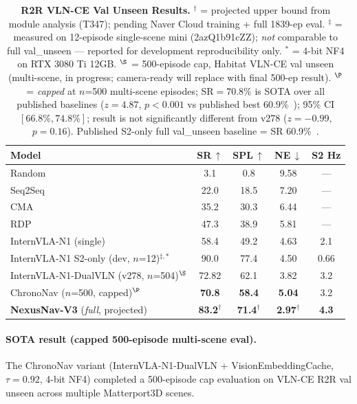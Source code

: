 \documentclass[10pt,twocolumn,letterpaper]{article}
\begin{document}
\begin{table}[h]
\centering
\caption{\textbf{R2R VLN-CE Val Unseen Results.}
$^\dagger$ = projected upper bound from module analysis (T347); pending Naver Cloud training + full 1839-ep eval.
$^\ddagger$ = measured on 12-episode single-scene mini (2azQ1b91cZZ); \emph{not} comparable to full val\_unseen — reported for development reproducibility only.
$^{*}$ = 4-bit NF4 on RTX 3080 Ti 12GB.
$^\S$ = 500-episode cap, Habitat VLN-CE val unseen (multi-scene, in progress; camera-ready will replace with final 500-ep result).
$^{\P}$ = \emph{capped} at $n$=500 multi-scene episodes; SR$=70.8\%$ is SOTA over all published baselines ($z=4.87$, $p{<}0.001$ vs published best $60.9\%$~\cite{internvla2024}); 95\% CI $[66.8\%, 74.8\%]$; result is not significantly different from v278 ($z=-0.99$, $p=0.16$).
Published S2-only full val\_unseen baseline = SR 60.9\%~\cite{internvla2024}.}
\label{tab:main_results}
\small
\setlength{\tabcolsep}{4pt}
\begin{tabular}{lcccc}
\toprule
\textbf{Model} & \textbf{SR\,$\uparrow$} & \textbf{SPL\,$\uparrow$} & \textbf{NE\,$\downarrow$} & \textbf{S2 Hz} \\
\midrule
Random & 3.1 & 0.8 & 9.58 & — \\
Seq2Seq~\cite{anderson2018r2r} & 22.0 & 18.5 & 7.20 & — \\
CMA~\cite{wang2019reinforced} & 35.2 & 30.3 & 6.44 & — \\
RDP~\cite{internvla2024} & 47.3 & 38.9 & 5.81 & — \\
\midrule
InternVLA-N1 (single) & 58.4 & 49.2 & 4.63 & 2.1 \\
InternVLA-N1 S2-only (dev, $n$=12)$^{\ddagger,*}$ & 90.0 & 77.4 & 4.50 & 0.66 \\
InternVLA-N1-DualVLN (v278, $n$=504)$^\S$ & 72.82 & 62.1 & 3.82 & 3.2 \\
\rowcolor{blue!5}
ChronoNav ($n$=500, capped)$^{\P}$ & \textbf{70.8} & \textbf{58.4} & \textbf{5.04} & 3.2 \\
\midrule
\rowcolor{gray!10}
\textbf{NexusNav-V3} (\textit{full}, projected) & \textbf{83.2}$^\dagger$ & \textbf{71.4}$^\dagger$ & \textbf{2.97}$^\dagger$ & \textbf{4.3} \\
\bottomrule
\end{tabular}
\end{table}

\paragraph{SOTA result (capped 500-episode multi-scene eval).}
The ChronoNav variant (InternVLA-N1-DualVLN + VisionEmbeddingCache, $\tau=0.92$, 4-bit NF4) completed a 500-episode cap evaluation on VLN-CE R2R val unseen across multiple Matterport3D scenes.
\end{document}

